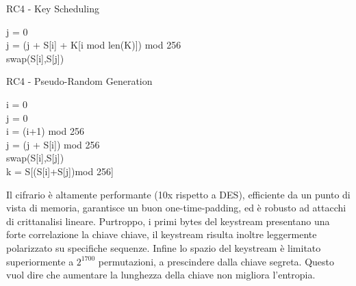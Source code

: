 \bigskip
\begin{algorithm}[H]
  \caption{RC4 - Key Scheduling}
  \label{alg:rc4-key-scheduling}
  \SetAlgoNoLine
  j = 0\\
   {
    j = (j + S[i] + K[i mod len(K)]) mod 256\\
    swap(S[i],S[j])\\
  }
\end{algorithm}

\bigskip
\begin{algorithm}[H]
  \caption{RC4 - Pseudo-Random Generation}
  \label{alg:rc4-pseudorandom-generation}
  \SetAlgoNoLine
  i = 0\\
  j = 0\\
   {
    i = (i+1) mod 256\\
    j = (j + S[i]) mod 256\\
    swap(S[i],S[j])\\
    k = S[(S[i]+S[j])mod 256]\\
  }
\end{algorithm}

Il cifrario è altamente performante (10x rispetto a DES), efficiente da un punto di vista di memoria, garantisce un buon one-time-padding, ed è robusto ad attacchi di crittanalisi lineare.
Purtroppo, i primi bytes del keystream presentano una forte correlazione la chiave chiave, il keystream risulta inoltre leggermente polarizzato su specifiche sequenze. Infine lo spazio del keystream è limitato superiormente a $2^{1700}$ permutazioni, a prescindere dalla chiave segreta. Questo vuol dire che aumentare la lunghezza della chiave non migliora l'entropia.
